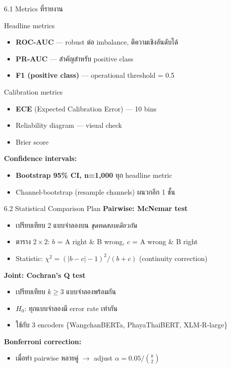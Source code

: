 \documentclass[aspectratio=169,11pt,xcolor=dvipsnames]{beamer}
\newcommand{\hl}[1]{\textcolor{kmitlOrange}{\textbf{#1}}}
\newcommand{\hlb}[1]{\textcolor{kmitlBlue}{\textbf{#1}}}
\begin{document}
\begin{frame}{6.1 Metrics ที่รายงาน}
  \begin{block}{Headline metrics}
    \begin{itemize}
      \item \hlb{ROC-AUC} — robust ต่อ imbalance, ตีความเชิงอันดับได้
      \item \hlb{PR-AUC} — สำคัญสำหรับ positive class
      \item \hlb{F1 (positive class)} — operational threshold = 0.5
    \end{itemize}
  \end{block}
  \begin{block}{Calibration metrics}
    \begin{itemize}
      \item \hlb{ECE} (Expected Calibration Error) — 10 bins
      \item Reliability diagram — visual check
      \item Brier score
    \end{itemize}
  \end{block}
  \textbf{Confidence intervals:}
  \begin{itemize}
    \item \hl{Bootstrap 95\% CI, n=1{,}000} ทุก headline metric
    \item Channel-bootstrap (resample channels) ผนวกอีก 1 ชั้น
  \end{itemize}
\end{frame}

\begin{frame}{6.2 Statistical Comparison Plan}
  \textbf{Pairwise: McNemar test}
  \begin{itemize}
    \item เปรียบเทียบ 2 แบบจำลองบน \emph{ชุดทดสอบเดียวกัน}
    \item ตาราง $2\times 2$: $b$ = A right \& B wrong, $c$ = A wrong \& B right
    \item Statistic: $\chi^2 = (|b-c|-1)^2 / (b+c)$ (continuity correction)
  \end{itemize}
  \vspace{0.4em}
  \textbf{Joint: Cochran's Q test}
  \begin{itemize}
    \item เปรียบเทียบ $k \geq 3$ แบบจำลองพร้อมกัน
    \item $H_0$: ทุกแบบจำลองมี error rate เท่ากัน
    \item ใช้กับ 3 encoders \{WangchanBERTa, PhayaThaiBERT, XLM-R-large\}
  \end{itemize}
  \vspace{0.4em}
  \textbf{Bonferroni correction:}
  \begin{itemize}
    \item เมื่อทำ pairwise หลายคู่ $\rightarrow$ adjust $\alpha = 0.05 / \binom{k}{2}$
  \end{itemize}
\end{frame}
\end{document}
